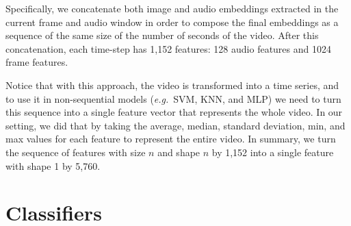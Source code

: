Specifically, we concatenate both image and audio embeddings extracted in the current frame and audio window in order to compose the final embeddings as a sequence of the same size of the number of seconds of the video. After this concatenation, each time-step has 1,152 features: 128 audio features and 1024 frame features.

Notice that with this approach, the video is transformed into a time series, and to use it in non-sequential models (\textit{e.g.}~SVM, KNN, and MLP) we need to turn this sequence into a single feature vector that represents the whole video. In our setting, we did that by taking the average, median, standard deviation, min, and max values for each feature to represent the entire video. In summary, we turn the sequence of features with size $n$ and shape $n$ by 1,152 into a single feature with shape 1 by 5,760.

\section{Classifiers}
\label{sec:classifiers}


